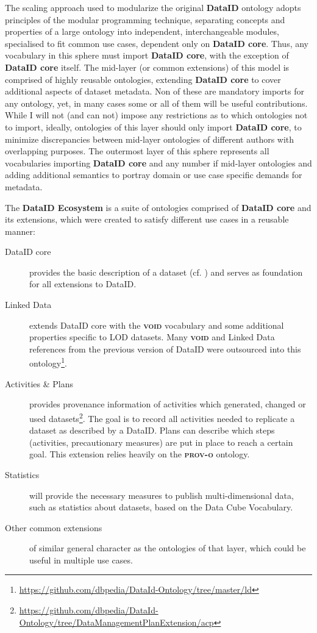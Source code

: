 \documentclass[a4paper,english,twoside,BCOR1.5cm,headsepline,DIV12,appendixprefix,final,12pt]{scrbook}
\newcommand{\ecosystem}{{\ttfamily\bfseries DataID Ecosystem}\xspace}
\newcommand{\dataid}{{\ttfamily\bfseries DataID}\xspace}
\newcommand{\core}{{\ttfamily\bfseries DataID core}\xspace}
\newcommand{\prov}{{\scshape\bfseries prov-o}\xspace}
\newcommand{\void}{{\scshape\bfseries void}\xspace}
\newcommand\footnoteurl[1]{\footnote{\scriptsize\url{#1}}}
\begin{document}
The scaling approach used to modularize the original \dataid ontology adopts principles of the modular programming technique, separating concepts and properties of a large ontology into independent, interchangeable modules, specialised to fit common use cases, dependent only on \core. Thus, any vocabulary in this sphere must import \core, with the exception of \core itself. 
The mid-layer (or common extensions) of this model is comprised of highly reusable ontologies, extending \core to cover additional aspects of dataset metadata. Non of these are mandatory imports for any ontology, yet, in many cases some or all of them will be useful contributions. While I will not (and can not) impose any restrictions as to which ontologies not to import, ideally, ontologies of this layer should only import \core, to minimize discrepancies between mid-layer ontologies of different authors with overlapping purposes. The outermost layer of this sphere represents all vocabularies importing \core and any number if mid-layer ontologies and adding additional semantics to portray domain or use case specific demands for metadata.

The \ecosystem is a suite of ontologies comprised of \core and its extensions, which were created to satisfy different use cases in a reusable manner:

\begin{description}
\item[DataID core] provides the basic description of a dataset (cf. ) and serves as foundation for all extensions to DataID.
\item[Linked Data] extends DataID core with the \void vocabulary\cite{void} and some additional properties specific to LOD datasets. Many \void and Linked Data references from the previous version of DataID were outsourced into this ontology\footnoteurl{https://github.com/dbpedia/DataId-Ontology/tree/master/ld}.
\item[Activities \& Plans] provides provenance information of activities which generated, changed or used datasets\footnoteurl{https://github.com/dbpedia/DataId-Ontology/tree/DataManagementPlanExtension/acp}. The goal is to record all activities needed to replicate a dataset as described by a DataID. Plans can describe which steps (activities, precautionary measures) are put in place to reach a certain goal. This extension relies heavily on the \prov ontology\cite{prov}.
\item[Statistics] will provide the necessary measures to publish multi-dimensional data, such as statistics about datasets, based on the Data Cube Vocabulary\cite{datacube}. 
\item[Other common extensions] of similar general character as the ontologies of that layer, which could be useful in multiple use cases.
\end{description}
\end{document}
